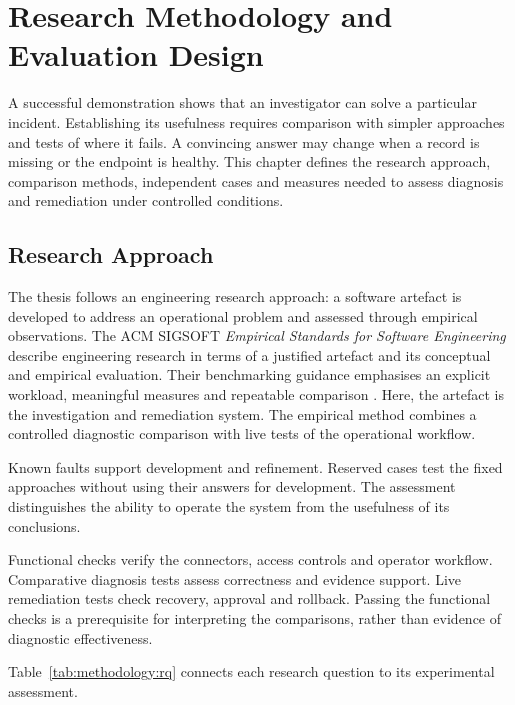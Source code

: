 \chapter{Research Methodology and Evaluation Design}
\label{cha:methodology}

A successful demonstration shows that an investigator can solve a
particular incident. Establishing its usefulness requires comparison
with simpler approaches and tests of where it fails. A convincing answer
may change when a record is missing or the endpoint is healthy. This
chapter defines the research approach, comparison methods, independent
cases and measures needed to assess diagnosis and remediation under
controlled conditions.

\section{Research Approach}
\label{sec:methodology:approach}

The thesis follows an engineering research approach: a software artefact
is developed to address an operational problem and assessed through
empirical observations. The ACM SIGSOFT \emph{Empirical Standards for
Software Engineering} describe engineering research in terms of a
justified artefact and its conceptual and empirical evaluation. Their
benchmarking guidance emphasises an explicit workload, meaningful measures
and repeatable comparison \parencite[Engineering Research and
Benchmarking]{sigsoft2026empirical}. Here, the artefact is the investigation
and remediation system. The empirical method combines a controlled
diagnostic comparison with live tests of the operational workflow.

Known faults support development and refinement. Reserved cases test the
fixed approaches without using their answers for development. The
assessment distinguishes the ability to operate the system from the
usefulness of its conclusions.

Functional checks verify the connectors, access controls and operator
workflow. Comparative diagnosis tests assess correctness and evidence
support. Live remediation tests check recovery, approval and rollback.
Passing the functional checks is a prerequisite for interpreting the
comparisons, rather than evidence of diagnostic effectiveness.

Table~\ref{tab:methodology:rq} connects each research question to its
experimental assessment.

